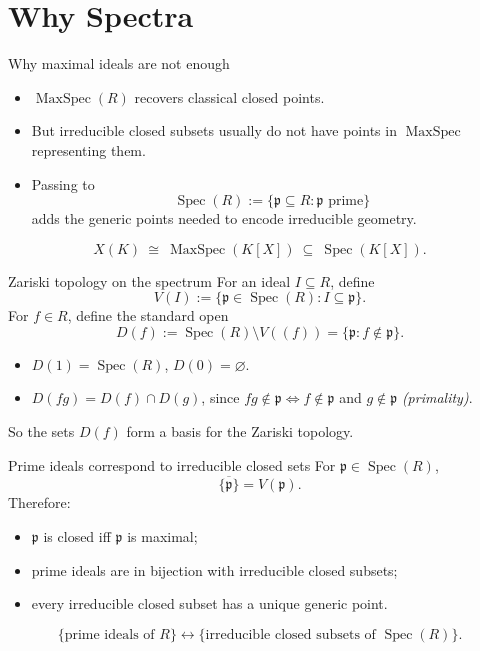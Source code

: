 \documentclass[10pt, aspectratio=169]{beamer}
\DeclareMathOperator{\Spec}{Spec}
\DeclareMathOperator{\MaxSpec}{MaxSpec}
\begin{document}
\section{Why Spectra}

\begin{frame}{Why maximal ideals are not enough}
    \begin{itemize}
        \item $\MaxSpec(R)$ recovers classical closed points.
        \item But irreducible closed subsets usually do not have points in $\MaxSpec$ representing them.
        \item Passing to
        \[
        \Spec(R) := \{\mathfrak p \subseteq R : \mathfrak p \text{ prime}\}
        \]
        adds the generic points needed to encode irreducible geometry.
    \end{itemize}
    \[
    \boxed{X(K)\ \cong\ \MaxSpec(K[X])\ \subseteq\ \Spec(K[X]).}
    \]
\end{frame}

\begin{frame}{Zariski topology on the spectrum}
    For an ideal $I \subseteq R$, define
    \[
    V(I) := \{\mathfrak p \in \Spec(R) : I \subseteq \mathfrak p\}.
    \]
    For $f \in R$, define the standard open
    \[
    D(f) := \Spec(R) \setminus V((f)) = \{\mathfrak p : f \notin \mathfrak p\}.
    \]
    \begin{itemize}
        \item $D(1) = \Spec(R)$, \quad $D(0) = \varnothing$.
        \item $D(fg) = D(f) \cap D(g)$, since $fg \notin \mathfrak p \iff f \notin \mathfrak p$ and $g \notin \mathfrak p$ \emph{(primality)}.
    \end{itemize}
    So the sets $D(f)$ form a basis for the Zariski topology.
\end{frame}

\begin{frame}{Prime ideals correspond to irreducible closed sets}
    For $\mathfrak p \in \Spec(R)$,
    \[
    \boxed{\overline{\{\mathfrak p\}} = V(\mathfrak p).}
    \]
    Therefore:
    \begin{itemize}
        \item $\mathfrak p$ is closed iff $\mathfrak p$ is maximal;
        \item prime ideals are in bijection with irreducible closed subsets;
        \item every irreducible closed subset has a unique generic point.
    \end{itemize}
    \[
    \boxed{\{\text{prime ideals of } R\} \longleftrightarrow \{\text{irreducible closed subsets of } \Spec(R)\}.}
    \]
\end{frame}
\end{document}
